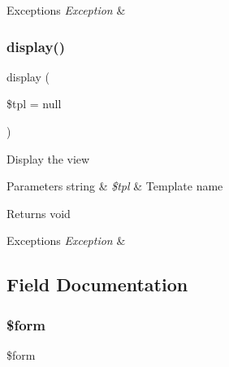 \begin{DoxyExceptions}{Exceptions}
{\em Exception} & \\
\hline
\end{DoxyExceptions}
\mbox{\label{classtks__agenda_view_item_aa988850da0dbeb9875debea0280754d5}} 
\subsubsection{display()\hspace{0.1cm}{\footnotesize\ttfamily [4/4]}}
{\footnotesize\ttfamily display (\begin{DoxyParamCaption}\item[{}]{\$tpl = {\ttfamily null} }\end{DoxyParamCaption})}

Display the view


\begin{DoxyParams}[1]{Parameters}
string & {\em \$tpl} & Template name\\
\hline
\end{DoxyParams}
\begin{DoxyReturn}{Returns}
void
\end{DoxyReturn}

\begin{DoxyExceptions}{Exceptions}
{\em Exception} & \\
\hline
\end{DoxyExceptions}


\subsection{Field Documentation}
\mbox{\label{classtks__agenda_view_item_a1a4fda4c28a9ee5f91102c023b9501f4}} 
\subsubsection{\$form}
{\footnotesize\ttfamily \$form\hspace{0.3cm}{\ttfamily [protected]}}

\mbox{\label{classtks__agenda_view_item_aa61b415cee119a7511e05c405ecd0b32}} 
